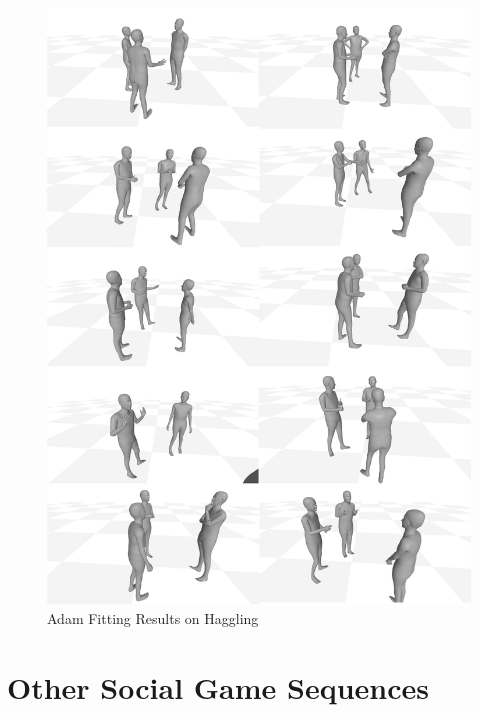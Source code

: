\begin{figure}
	\centering
	\includegraphics[width=\textwidth]{ssp_fig/haggling_adam}
	\caption{Adam Fitting Results on Haggling} 
	\label{fig:haggling_measurement_adam}
\end{figure}



\section{Other Social Game Sequences}


